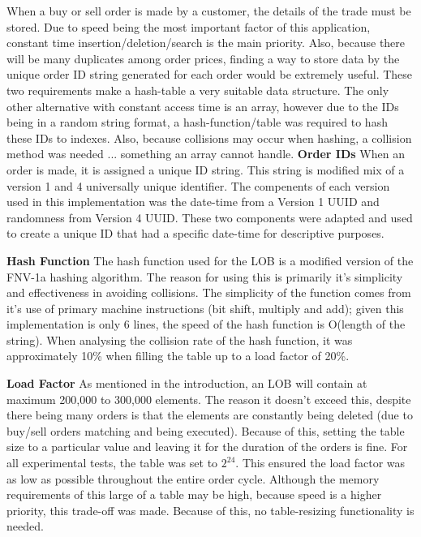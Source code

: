 \documentclass[11p]{article}
\def\nl{\newline}
\begin{document}
When a buy or sell order is made by a customer, the details of the trade must be stored. Due to speed being the most important factor of this application, constant time insertion/deletion/search is the main priority. Also, because there will be many duplicates among order prices, finding a way to store data by the unique order ID string generated for each order would be extremely useful. These two requirements make a hash-table a very suitable data structure. The only other alternative with constant access time is an array, however due to the IDs being in a random string format, a hash-function/table was required to hash these IDs to indexes. Also, because collisions may occur when hashing, a collision method was needed ... something an array cannot handle.\bigbreak
\textbf{Order IDs} \nl
When an order is made, it is assigned a unique ID string. This string is modified mix of a version 1 and 4 universally unique identifier. The compenents of each version used in this implementation was the date-time from a Version 1 UUID and randomness from Version 4 UUID. These two components were adapted and used to create a unique ID that had a specific date-time for descriptive purposes. \nl

\textbf{Hash Function} \nl
The hash function used for the LOB is a modified version of the FNV-1a hashing algorithm. The reason for using this is primarily it's simplicity and effectiveness in avoiding collisions. The simplicity of the function comes from it's use of primary machine instructions (bit shift, multiply and add); given this implementation is only 6 lines, the speed of the hash function is O(length of the string). When analysing the collision rate of the hash function, it was approximately 10\% when filling the table up to a load factor of 20\%. \nl

\textbf{Load Factor} \nl
As mentioned in the introduction, an LOB will contain at maximum 200,000 to 300,000 elements. The reason it doesn't exceed this, despite there being many orders is that the elements are constantly being deleted (due to buy/sell orders matching and being executed). Because of this, setting the table size to a particular value and leaving it for the duration of the orders is fine. For all experimental tests, the table was set to $2^{24}$. This ensured the load factor was as low as possible throughout the entire order cycle. Although the memory requirements of this large of a table may be high, because speed is a higher priority, this trade-off was made. Because of this, no table-resizing functionality is needed.\nl
\end{document}

